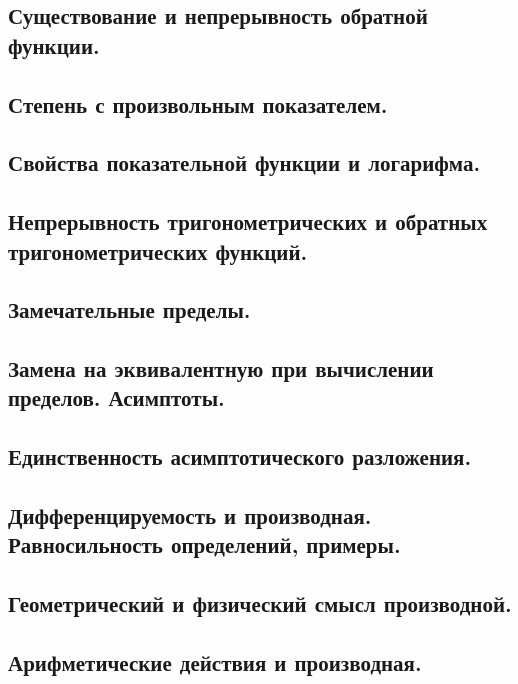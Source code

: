 \documentclass[12pt, a4paper]{article}
\begin{document}
\subsection{Существование и непрерывность обратной функции.}

\subsection{Степень с произвольным показателем.}

\subsection{Свойства показательной функции и логарифма.}

\subsection{Непрерывность тригонометрических и обратных тригонометрических функций.}

\subsection{Замечательные пределы.}

\subsection{Замена на эквивалентную при вычислении пределов. Асимптоты.}

\subsection{Единственность асимптотического разложения.}

\subsection{Дифференцируемость и производная. Равносильность определений, примеры.}

\subsection{Геометрический и физический смысл производной.}

\subsection{Арифметические действия и производная.}
\end{document}
